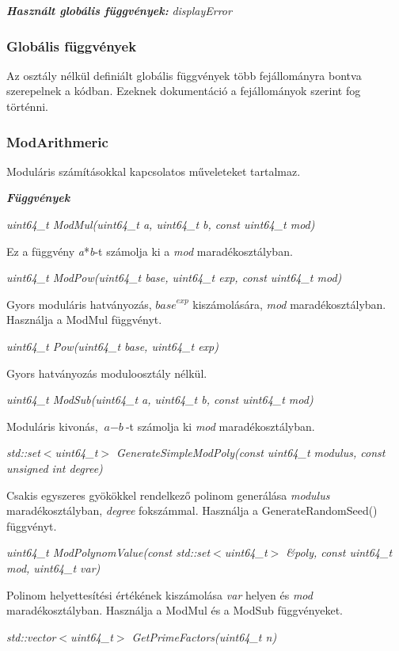 \documentclass[12pt]{article}
\begin{document}
\textit{\textbf{Használt globális függvények: }}\textit{displayError}

\subsubsection{Globális függvények}
Az osztály nélkül definiált globális függvények több fejállományra bontva szerepelnek a kódban. Ezeknek dokumentáció a fejállományok szerint fog történni.

\subsubsection*{ModArithmeric}
Moduláris számításokkal kapcsolatos műveleteket tartalmaz.

\textit{\textbf{Függvények}}

\textit{uint64\_t ModMul(uint64\_t a, uint64\_t b, const uint64\_t mod)}

Ez a függvény \textit{a}*\textit{b}-t számolja ki a \textit{mod} 
maradékosztályban.

\textit{uint64\_t ModPow(uint64\_t base, uint64\_t exp, const uint64\_t mod)}

Gyors moduláris hatványozás, $\textit{base}^\textit{exp}$ kiszámolására, \textit{mod} maradékosztályban. Használja a ModMul függvényt.

\textit{uint64\_t Pow(uint64\_t base, uint64\_t exp)}

Gyors hatványozás moduloosztály nélkül.

\textit{uint64\_t ModSub(uint64\_t a, uint64\_t b, const uint64\_t mod)}

Moduláris kivonás, $\textit{a}-\textit{b}$-t számolja ki \textit{mod} maradékosztályban.

\textit{std::set$<$uint64\_t$>$ GenerateSimpleModPoly(const uint64\_t modulus, const unsigned int degree)}

Csakis egyszeres gyökökkel rendelkező polinom generálása \textit{modulus} maradékosztályban, \textit{degree} fokszámmal. Használja a GenerateRandomSeed() függvényt.

\textit{uint64\_t ModPolynomValue(const std::set$<$uint64\_t$>$ \&poly, const uint64\_t mod, uint64\_t var)}

Polinom helyettesítési értékének kiszámolása \textit{var} helyen és \textit{mod} maradékosztályban. Használja a ModMul és a ModSub függvényeket.

\textit{std::vector$<$uint64\_t$>$ GetPrimeFactors(uint64\_t n)}
\end{document}
